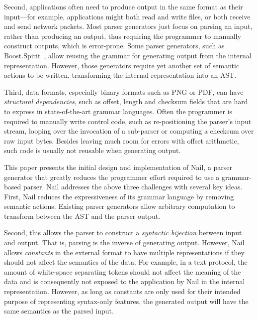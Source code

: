 Second,  applications often need to produce output in the same
format as their input---for example, applications might both
read and write files, or both receive and send network packets.
Most parser generators just focus on parsing an input, rather
than producing an output, thus requiring the programmer to manually
construct outputs, which is error-prone.  Some parser generators, such as
Boost.Spirit~\cite{boost-spirit},
allow reusing the grammar for generating output from the internal
representation.  However, those generators require yet another set of
semantic actions to be written, transforming the internal representation
into an AST\@.


Third, data formats, especially binary formats such as PNG or PDF, can have \emph{structural dependencies}, such as offset, length and checksum fields
that are hard to express in state-of-the-art grammar languages. Often the programmer is required to
manually write control code, such as re-positioning the parser's input stream, looping over the
invocation of a sub-parser or computing a
checksum over raw input bytes.  Besides leaving much room for errors with offset arithmetic, such
code is usually not reusable when generating output.


This paper presents the initial design and implementation of Nail, a parser
generator that greatly reduces the programmer effort required to use a
grammar-based parser. Nail addresses the above three challenges with several key
ideas. First, Nail reduces the expressiveness of its grammar language by
removing semantic actions. Existing parser generators allow arbitrary
computation to transform between the AST and the parser output.%

Second, this allows the parser to construct a \emph{syntactic bijection} between input
and output. That is, parsing is the inverse of generating output. However,
Nail allows \emph{constants} in the external format to have multiple
representations if they should not affect the semantics of the data. For
example, in a text protocol, the amount of white-space separating tokens should
not affect the meaning of the data and is consequently not exposed to the
application by Nail in the internal representation. However, as long as
constants are only used for their intended purpose of representing syntax-only
features, the generated output will have the same semantics as the parsed input. 

